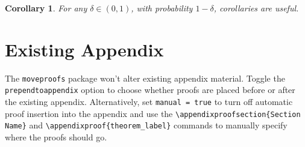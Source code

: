 \documentclass{article}
\newtheorem{corollary}[theorem]{Corollary}
\begin{document}
\begin{corollary}\label{corollary_two}
For any $\delta \in (0, 1)$, with probability $1 - \delta$, corollaries are useful.
\end{corollary}


\appendix
\section{Existing Appendix}
The \texttt{moveproofs} package won't alter existing appendix material.
Toggle the \texttt{prependtoappendix} option to choose whether proofs are placed before or after the existing appendix.
Alternatively, set \texttt{manual = true} to turn off automatic proof insertion into the appendix and use the \texttt{\textbackslash appendixproofsection\{Section Name\}} and \texttt{\textbackslash appendixproof\{theorem\_label\}} commands to manually specify where the proofs should go.
\end{document}
